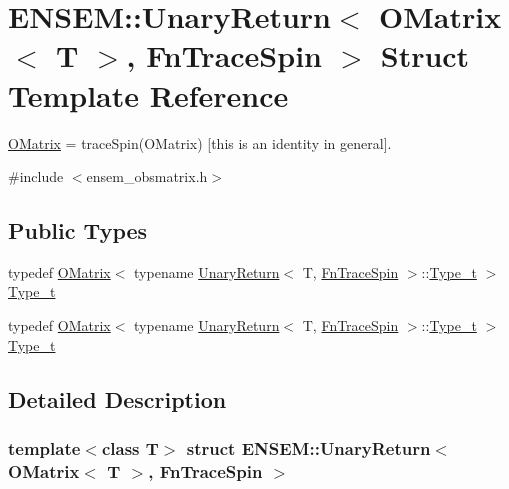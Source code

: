 \hypertarget{structENSEM_1_1UnaryReturn_3_01OMatrix_3_01T_01_4_00_01FnTraceSpin_01_4}{}\section{E\+N\+S\+EM\+:\+:Unary\+Return$<$ O\+Matrix$<$ T $>$, Fn\+Trace\+Spin $>$ Struct Template Reference}
\label{structENSEM_1_1UnaryReturn_3_01OMatrix_3_01T_01_4_00_01FnTraceSpin_01_4}


\mbox{\hyperlink{classENSEM_1_1OMatrix}{O\+Matrix}} = trace\+Spin(\+O\+Matrix) \mbox{[}this is an identity in general\mbox{]}.  




{\ttfamily \#include $<$ensem\+\_\+obsmatrix.\+h$>$}

\subsection*{Public Types}
\begin{DoxyCompactItemize}
\item 
typedef \mbox{\hyperlink{classENSEM_1_1OMatrix}{O\+Matrix}}$<$ typename \mbox{\hyperlink{structENSEM_1_1UnaryReturn}{Unary\+Return}}$<$ T, \mbox{\hyperlink{structENSEM_1_1FnTraceSpin}{Fn\+Trace\+Spin}} $>$\+::\mbox{\hyperlink{structENSEM_1_1UnaryReturn_3_01OMatrix_3_01T_01_4_00_01FnTraceSpin_01_4_a9d6cbecc05de075e41d52fd0b7f2b55e}{Type\+\_\+t}} $>$ \mbox{\hyperlink{structENSEM_1_1UnaryReturn_3_01OMatrix_3_01T_01_4_00_01FnTraceSpin_01_4_a9d6cbecc05de075e41d52fd0b7f2b55e}{Type\+\_\+t}}
\item 
typedef \mbox{\hyperlink{classENSEM_1_1OMatrix}{O\+Matrix}}$<$ typename \mbox{\hyperlink{structENSEM_1_1UnaryReturn}{Unary\+Return}}$<$ T, \mbox{\hyperlink{structENSEM_1_1FnTraceSpin}{Fn\+Trace\+Spin}} $>$\+::\mbox{\hyperlink{structENSEM_1_1UnaryReturn_3_01OMatrix_3_01T_01_4_00_01FnTraceSpin_01_4_a9d6cbecc05de075e41d52fd0b7f2b55e}{Type\+\_\+t}} $>$ \mbox{\hyperlink{structENSEM_1_1UnaryReturn_3_01OMatrix_3_01T_01_4_00_01FnTraceSpin_01_4_a9d6cbecc05de075e41d52fd0b7f2b55e}{Type\+\_\+t}}
\end{DoxyCompactItemize}


\subsection{Detailed Description}
\subsubsection*{template$<$class T$>$\newline
struct E\+N\+S\+E\+M\+::\+Unary\+Return$<$ O\+Matrix$<$ T $>$, Fn\+Trace\+Spin $>$}

